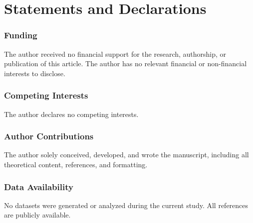 \documentclass[entropy,article,submit,pdftex,moreauthors]{Definitions/mdpi}
\begin{document}

\section*{Statements and Declarations}
\subsubsection{Funding}  
The author received no financial support for the research, authorship, or publication of this article.
The author has no relevant financial or non-financial interests to disclose.

\subsubsection{Competing Interests}  
The author declares no competing interests.

\subsubsection{Author Contributions}  
The author solely conceived, developed, and wrote the manuscript, including all theoretical content, references, and formatting.

\subsubsection{Data Availability}  
No datasets were generated or analyzed during the current study. All references are publicly available.
\end{document}
